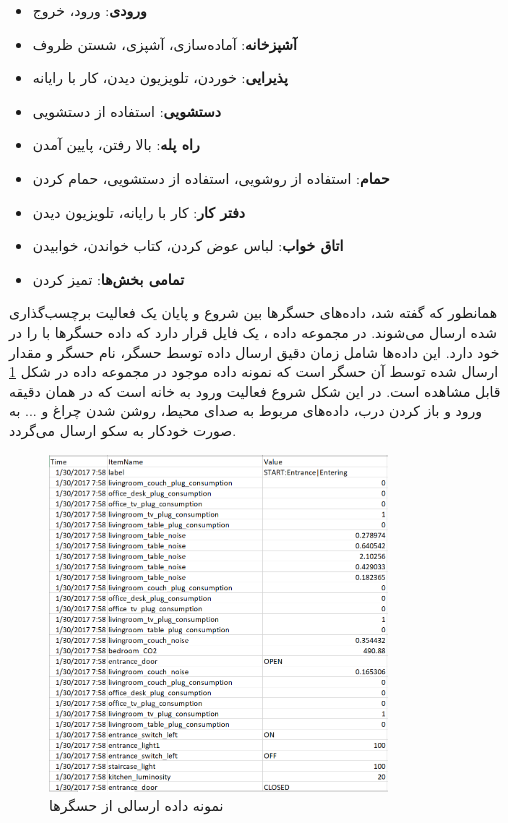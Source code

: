 \begin{itemize}
\item \textbf{ورودی}: ورود، خروج
\item \textbf{آشپزخانه}: آماده‌سازی، آشپزی، شستن ظروف
\item \textbf{پذیرایی}: خوردن، تلویزیون دیدن، کار با رایانه
\item \textbf{دستشویی}: استفاده از دستشویی
\item \textbf{راه پله}: بالا رفتن، پایین آمدن
\item \textbf{حمام}: استفاده از روشویی، استفاده از دستشویی، حمام کردن
\item \textbf{دفتر کار}: کار با رایانه، تلویزیون دیدن
\item \textbf{اتاق خواب}: لباس عوض کردن، کتاب خواندن، خوابیدن
\item \textbf{تمامی بخش‌ها}: تمیز کردن
\end{itemize}

همانطور که گفته شد، داده‌های حسگرها بین شروع و پایان یک فعالیت برچسب‌گذاری شده ارسال می‌شوند. در مجموعه داده ، یک فایل  قرار دارد که داده حسگرها با را در خود دارد. این داده‌ها شامل زمان دقیق ارسال داده توسط حسگر، نام حسگر و مقدار ارسال شده توسط آن حسگر است که نمونه داده‌ موجود در مجموعه داده در شکل \ref{fig:fO4H3} قابل مشاهده است. در این شکل شروع فعالیت ورود به خانه است که در همان دقیقه ورود و باز کردن درب، داده‌های مربوط به صدای محیط، روشن شدن چراغ و ... به صورت خودکار به سکو ارسال می‌گردد.

\begin{figure}[H]
\centerline{\includegraphics[width=0.8\textwidth]{figs/fO4H3.png}}
\caption{نمونه داده ارسالی از حسگرها}
\label{fig:fO4H3}
\end{figure}


